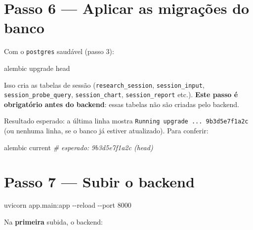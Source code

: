 \documentclass[
  brazilian,
  a4paper,12pt,oneside]{report}
\newenvironment{Shaded}{}{}
\newcommand{\CommentTok}[1]{\textcolor[rgb]{0.38,0.63,0.69}{\textit{#1}}}
\newcommand{\DecValTok}[1]{\textcolor[rgb]{0.25,0.63,0.44}{#1}}
\newcommand{\FunctionTok}[1]{\textcolor[rgb]{0.02,0.16,0.49}{#1}}
\newcommand{\NormalTok}[1]{#1}
\newcommand{\OperatorTok}[1]{\textcolor[rgb]{0.40,0.40,0.40}{#1}}
\begin{document}
\section{Passo 6 --- Aplicar as migrações do
banco}\label{passo-6-aplicar-as-migrauxe7uxf5es-do-banco}

Com o \texttt{postgres} saudável (passo 3):

\begin{Shaded}
\begin{Highlighting}[]
\NormalTok{alembic upgrade head}
\end{Highlighting}
\end{Shaded}

Isso cria as tabelas de sessão
(\texttt{research\_}\allowbreak{}\texttt{session},
\texttt{session\_}\allowbreak{}\texttt{input},
\texttt{session\_}\allowbreak{}\texttt{probe\_}\allowbreak{}\texttt{query},
\texttt{session\_}\allowbreak{}\texttt{chart},
\texttt{session\_}\allowbreak{}\texttt{report} etc.). \textbf{Este passo
é obrigatório antes do backend}: essas tabelas não são criadas pelo
backend.

Resultado esperado: a última linha mostra
\texttt{Running\ upgrade\ .}\allowbreak{}\texttt{.}\allowbreak{}\texttt{.}\allowbreak{}\texttt{\ 9b3d5e7f1a2c}
(ou nenhuma linha, se o banco já estiver atualizado). Para conferir:

\begin{Shaded}
\begin{Highlighting}[]
\NormalTok{alembic current}
\CommentTok{\# esperado: 9b3d5e7f1a2c (head)}
\end{Highlighting}
\end{Shaded}

\section{Passo 7 --- Subir o backend}\label{passo-7-subir-o-backend}

\begin{Shaded}
\begin{Highlighting}[]
\NormalTok{uvicorn app}\OperatorTok{.}\FunctionTok{main}\OperatorTok{:}\NormalTok{app }\OperatorTok{{-}{-}}\NormalTok{reload }\OperatorTok{{-}{-}}\NormalTok{port }\DecValTok{8000}
\end{Highlighting}
\end{Shaded}

Na \textbf{primeira} subida, o backend:
\end{document}
